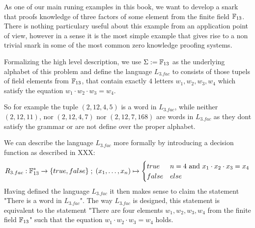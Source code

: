 \begin{example}[3-Factorization]
As one of our main runing examples in this book, we want to develop a snark that proofs knowledge of three factors of some element from the finite field $\mathbb{F}_{13}$. There is nothing particulary useful about this example from an application point of view, however in a sense it is the most simple example that gives rise to a non trivial snark in some of the most common zero knowledge proofing systems. 

Formalizing the high level description, we use $\Sigma := \mathbb{F}_{13}$ as the underlying alphabet of this problem and define the language $L_{3.fac}$ to consists of those tupels of field elements from $\mathbb{F}_{13}$, that contain exactly $4$ letters $w_1,w_2,w_3,w_4$ which satisfy the equation $w_1\cdot w_2\cdot w_3 =w_4$.   

So for example the tuple $(2, 12, 4, 5)$ is a word in $L_{3.fac}$, while neither $(2, 12, 11)$, nor $(2, 12, 4, 7)$ nor $(2, 12, 7, 168)$ are words in $L_{3.fac}$ as they dont satisfy the grammar or are not define over the proper alphabet. 

We can describe the language $L_{3.fac}$ more formally by introducing a decision function as described in XXX:
$$
R_{3.fac} : \mathbb{F}_{13}^* \to \{true, false\}\;;\;
(x_1,\ldots,x_n) \mapsto
\begin{cases}
true & n=4 \text{ and } x_1\cdot x_2 \cdot x_3 = x_4\\
false & else
\end{cases}
$$
Having defined the language $L_{3.fac}$ it then makes sense to claim the statement "There is a word in $L_{3.fac}$". The way $L_{3.fac}$ is designed, this statement is equivalent to the statement "There are four elements $w_1,w_2,w_3,w_4$ from the finite field $\mathbb{F}_{13}$" such that the equation $w_1\cdot w_2\cdot w_3 =w_4$ holds. 


\end{example}
